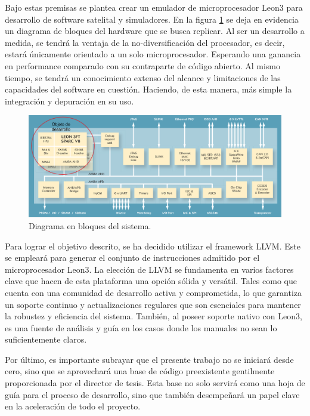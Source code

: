 Bajo estas premisas se plantea crear un emulador de microprocesador Leon3 para desarrollo de software satelital y simuladores. En la figura \ref{fig:Components} se deja en evidencia un diagrama de bloques del hardware que se busca replicar. Al ser un desarrollo a medida, se tendrá la ventaja de la no-diversificación del procesador, es decir, estará únicamente orientado a un solo microprocesador. Esperando una ganancia en performance comparado con su contraparte de código abierto. Al mismo tiempo, se tendrá un conocimiento extenso del alcance y limitaciones de las capacidades del software en cuestión. Haciendo, de esta manera, más simple la integración y depuración en su uso.

\begin{figure}[htpb]
\centering
\includegraphics[width=1\textwidth]{./assets/Components.png}
\caption{Diagrama en bloques del sistema.}
\label{fig:Components}
\end{figure}

\vspace{25px}

\newpage

Para lograr el objetivo descrito, se ha decidido utilizar el framework LLVM. Este se empleará para generar el conjunto de instrucciones admitido por el microprocesador Leon3. La elección de LLVM se fundamenta en varios factores clave que hacen de esta plataforma una opción sólida y versátil. Tales como que cuenta con una comunidad de desarrollo activa y comprometida, lo que garantiza un soporte continuo y actualizaciones regulares que son esenciales para mantener la robustez y eficiencia del sistema. También, al poseer soporte nativo con Leon3, es una fuente de análisis y guía en los casos donde los manuales no sean lo suficientemente claros.

Por último, es importante subrayar que el presente trabajo no se iniciará desde cero, sino que se aprovechará una base de código preexistente gentilmente proporcionada por el director de tesis. Esta base no solo servirá como una hoja de guía para el proceso de desarrollo, sino que también desempeñará un papel clave en la aceleración de todo el proyecto.
